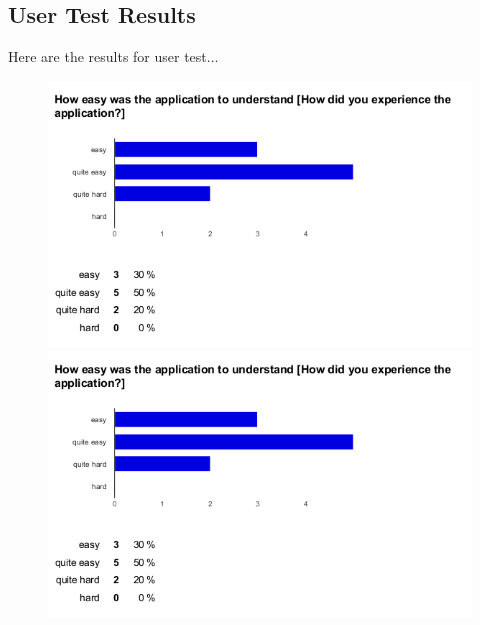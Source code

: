 \subsection{User Test Results}

Here are the results for user test...
\begin{figure}[b!]
  \centering
    \begin{minipage}{0.50\textwidth}
      \centering
        \includegraphics[width=1.80\textwidth]{00_resources/figures/survey_results1.png}
    \end{minipage}
    \begin{minipage}{0.50\textwidth}
      \centering
        \includegraphics[width=1.80\textwidth]{00_resources/figures/survey_results1.png}
    \end{minipage}
    \begin{minipage}{0.50\textwidth}
      \centering

\end{minipage}
\end{figure}

